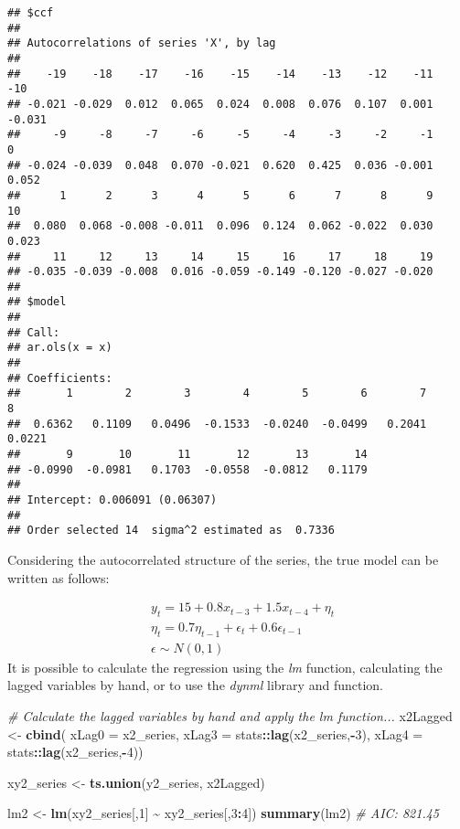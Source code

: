 \documentclass[
]{article}
\newenvironment{Shaded}{\begin{snugshade}}{\end{snugshade}}
\newcommand{\AttributeTok}[1]{\textcolor[rgb]{0.13,0.29,0.53}{#1}}
\newcommand{\CommentTok}[1]{\textcolor[rgb]{0.56,0.35,0.01}{\textit{#1}}}
\newcommand{\DecValTok}[1]{\textcolor[rgb]{0.00,0.00,0.81}{#1}}
\newcommand{\FunctionTok}[1]{\textcolor[rgb]{0.13,0.29,0.53}{\textbf{#1}}}
\newcommand{\NormalTok}[1]{#1}
\newcommand{\OtherTok}[1]{\textcolor[rgb]{0.56,0.35,0.01}{#1}}
\newcommand{\SpecialCharTok}[1]{\textcolor[rgb]{0.81,0.36,0.00}{\textbf{#1}}}
\begin{document}
\begin{verbatim}
## $ccf
## 
## Autocorrelations of series 'X', by lag
## 
##    -19    -18    -17    -16    -15    -14    -13    -12    -11    -10 
## -0.021 -0.029  0.012  0.065  0.024  0.008  0.076  0.107  0.001 -0.031 
##     -9     -8     -7     -6     -5     -4     -3     -2     -1      0 
## -0.024 -0.039  0.048  0.070 -0.021  0.620  0.425  0.036 -0.001  0.052 
##      1      2      3      4      5      6      7      8      9     10 
##  0.080  0.068 -0.008 -0.011  0.096  0.124  0.062 -0.022  0.030  0.023 
##     11     12     13     14     15     16     17     18     19 
## -0.035 -0.039 -0.008  0.016 -0.059 -0.149 -0.120 -0.027 -0.020 
## 
## $model
## 
## Call:
## ar.ols(x = x)
## 
## Coefficients:
##       1        2        3        4        5        6        7        8  
##  0.6362   0.1109   0.0496  -0.1533  -0.0240  -0.0499   0.2041   0.0221  
##       9       10       11       12       13       14  
## -0.0990  -0.0981   0.1703  -0.0558  -0.0812   0.1179  
## 
## Intercept: 0.006091 (0.06307) 
## 
## Order selected 14  sigma^2 estimated as  0.7336
\end{verbatim}

Considering the autocorrelated structure of the series, the true model can be written as follows:

\[
\begin{aligned} 
& y_t = 15 + 0.8x_{t-3} + 1.5x_{t-4} + \eta_t \\
& \eta_t = 0.7\eta_{t-1} + \epsilon_t + 0.6\epsilon_{t-1} \\
& \epsilon \sim N(0, 1)
\end{aligned} 
\]
It is possible to calculate the regression using the \emph{lm} function, calculating the lagged variables by hand, or to use the \emph{dynml} library and function.

\begin{Shaded}
\begin{Highlighting}[]
\CommentTok{\# Calculate the lagged variables by hand and apply the lm function...}
\NormalTok{x2Lagged }\OtherTok{\textless{}{-}} \FunctionTok{cbind}\NormalTok{(}
    \AttributeTok{xLag0 =}\NormalTok{ x2\_series,}
    \AttributeTok{xLag3 =}\NormalTok{ stats}\SpecialCharTok{::}\FunctionTok{lag}\NormalTok{(x2\_series,}\SpecialCharTok{{-}}\DecValTok{3}\NormalTok{),}
    \AttributeTok{xLag4 =}\NormalTok{ stats}\SpecialCharTok{::}\FunctionTok{lag}\NormalTok{(x2\_series,}\SpecialCharTok{{-}}\DecValTok{4}\NormalTok{))}

\NormalTok{xy2\_series }\OtherTok{\textless{}{-}} \FunctionTok{ts.union}\NormalTok{(y2\_series, x2Lagged)}

\NormalTok{lm2 }\OtherTok{\textless{}{-}} \FunctionTok{lm}\NormalTok{(xy2\_series[,}\DecValTok{1}\NormalTok{] }\SpecialCharTok{\textasciitilde{}}\NormalTok{ xy2\_series[,}\DecValTok{3}\SpecialCharTok{:}\DecValTok{4}\NormalTok{])}
\FunctionTok{summary}\NormalTok{(lm2) }\CommentTok{\# AIC: 821.45}
\end{Highlighting}
\end{Shaded}
\end{document}
